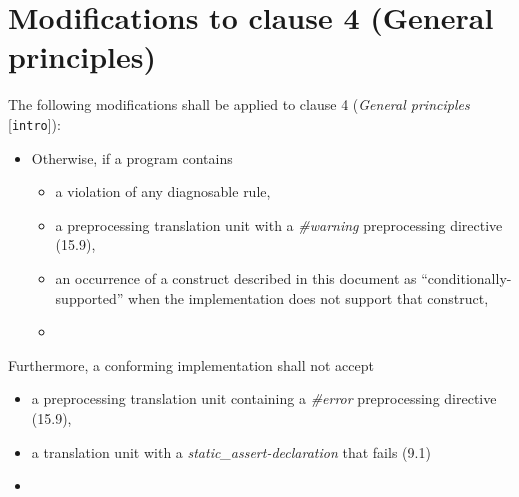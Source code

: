 \section{Modifications to clause 4 (General principles)}

The following modifications shall be applied to clause 4 (\emph{General
principles} [\texttt{intro}]):

\begin{modification}
\begin{itemize}[label=\textemdash]

\item
Otherwise, if a program contains

\begin{itemize}[label=\textemdash]

\item
a violation of any diagnosable rule,

\item
a preprocessing translation unit with a \emph{\#warning} preprocessing directive (15.9), 

\item
an occurrence of a construct described in this document as “conditionally-supported” when the
implementation does not support that construct, 

\item
{}
\end{itemize}
\end{itemize}

\end{modification}

\begin{modification}
Furthermore, a conforming implementation shall not accept

\begin{itemize}[label=\textemdash]

\item
a preprocessing translation unit containing a \emph{\#error} preprocessing
directive (15.9), 

\item a translation unit with a \emph{static\_assert-declaration} that fails
(9.1)

\item
{}

\end{itemize}
\end{modification}

